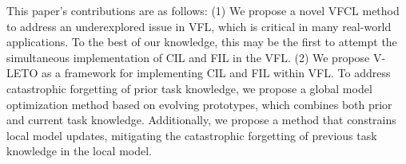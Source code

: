 This paper's contributions are as follows:
(1) We propose a novel VFCL method to address an underexplored issue in VFL, which is critical in many real-world applications. To the best of our knowledge, this may be the first to attempt the simultaneous implementation of CIL and FIL in the VFL.
(2) We propose V-LETO as a framework for implementing CIL and FIL within VFL. To address catastrophic forgetting of prior task knowledge, we propose a global model optimization method based on evolving prototypes, which combines both prior and current task knowledge. Additionally, we propose a method that constrains local model updates, mitigating the catastrophic forgetting of previous task knowledge in the local model.
